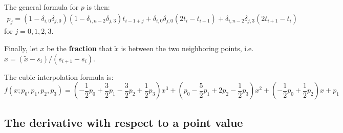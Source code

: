 \documentclass[11pt]{article}
\begin{document}
The general formula for $p$ is then:
\begin{equation}
\begin{split}
p_j 
= 
(1 - \delta_{i,0} \delta_{j,0} ) (1-\delta_{i,n-2} \delta_{j,3} ) t_{i-1+j}
+
\delta_{i,0} \delta_{j,0} ( 2 t_i - t_{i+1} )
+ \delta_{i,n-2} \delta_{j,3} ( 2 t_{i+1} - t_i )
\end{split}
\end{equation}
for $j=0,1,2,3$.

Finally, let $x$ be the \textbf{fraction} that $\tilde{x}$ is between the two neighboring points, i.e. $x = (\tilde{x} - s_i) / (s_{i+1} - s_i)$.

The cubic interpolation formula is:
\begin{equation}
f(x ; p_0, p_1, p_2, p_3) = \left ( - \frac{1}{2} p_0 + \frac{3}{2} p_1 - \frac{3}{2} p_2 + \frac{1}{2} p_3 \right ) x^3 + \left ( p_0 - \frac{5}{2} p_1 + 2 p_2 - \frac{1}{2} p_3 \right ) x^2 + \left ( - \frac{1}{2} p_0 + \frac{1}{2} p_2 \right ) x + p_1
\end{equation}



\subsection{The derivative with respect to a point value}

\end{document}

